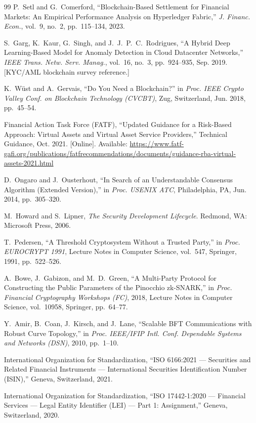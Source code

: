 \documentclass[journal,10pt,twocolumn]{IEEEtran}
\begin{document}
\begin{thebibliography}{99}
P.~Setl and G.~Comerford, ``Blockchain-Based Settlement for Financial Markets: An Empirical Performance Analysis on Hyperledger Fabric,'' \emph{J. Financ. Econ.}, vol.~9, no.~2, pp.~115--134, 2023.

S.~Garg, K.~Kaur, G.~Singh, and J.~J.~P.~C.~Rodrigues, ``A Hybrid Deep Learning-Based Model for Anomaly Detection in Cloud Datacenter Networks,'' \emph{IEEE Trans. Netw. Serv. Manag.}, vol.~16, no.~3, pp.~924--935, Sep. 2019. [KYC/AML blockchain survey reference.]

K.~Wüst and A.~Gervais, ``Do You Need a Blockchain?'' in \emph{Proc. IEEE Crypto Valley Conf. on Blockchain Technology (CVCBT)}, Zug, Switzerland, Jun. 2018, pp.~45--54.

Financial Action Task Force (FATF), ``Updated Guidance for a Risk-Based Approach: Virtual Assets and Virtual Asset Service Providers,'' Technical Guidance, Oct. 2021. [Online]. Available: \url{https://www.fatf-gafi.org/publications/fatfrecommendations/documents/guidance-rba-virtual-assets-2021.html}

D.~Ongaro and J.~Ousterhout, ``In Search of an Understandable Consensus Algorithm (Extended Version),'' in \emph{Proc. USENIX ATC}, Philadelphia, PA, Jun. 2014, pp.~305--320.

M.~Howard and S.~Lipner, \emph{The Security Development Lifecycle}. Redmond, WA: Microsoft Press, 2006.

T.~Pedersen, ``A Threshold Cryptosystem Without a Trusted Party,'' in \emph{Proc. EUROCRYPT 1991}, Lecture Notes in Computer Science, vol.~547, Springer, 1991, pp.~522--526.

A.~Bowe, J.~Gabizon, and M.~D.~Green, ``A Multi-Party Protocol for Constructing the Public Parameters of the Pinocchio zk-SNARK,'' in \emph{Proc. Financial Cryptography Workshops (FC)}, 2018, Lecture Notes in Computer Science, vol.~10958, Springer, pp.~64--77.

Y.~Amir, B.~Coan, J.~Kirsch, and J.~Lane, ``Scalable BFT Communications with Robust Curve Topology,'' in \emph{Proc. IEEE/IFIP Intl. Conf. Dependable Systems and Networks (DSN)}, 2010, pp.~1--10.

International Organization for Standardization, ``ISO 6166:2021 --- Securities and Related Financial Instruments --- International Securities Identification Number (ISIN),'' Geneva, Switzerland, 2021.

International Organization for Standardization, ``ISO 17442-1:2020 --- Financial Services --- Legal Entity Identifier (LEI) --- Part 1: Assignment,'' Geneva, Switzerland, 2020.

\end{thebibliography}
\end{document}
